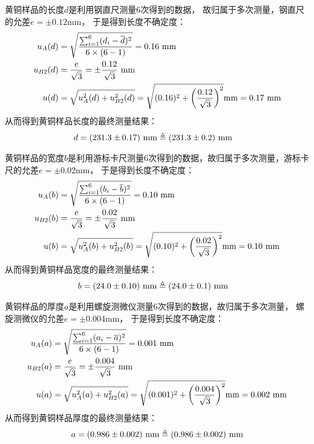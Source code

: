 \documentclass[11pt]{article}
\begin{document}
\newpage
黄铜样品的长度$d$是利用钢直尺测量6次得到的数据，
故归属于多次测量，钢直尺的允差$e=\pm 0.12$mm，
于是得到长度不确定度：
\begin{align*}
     u_A(d)&=\sqrt{\frac{\sum_{i=1}^6(d_i-\overline d)^2}{6\times(6-1)}}=0.16\,\,{\rm mm}\\
     u_{B2}(d)&=\frac{e}{\sqrt 3}=\pm \frac{0.12}{\sqrt 3} \,\,{\rm mm}\\
     u(d)&=
    \sqrt{u_{A}^2(d)+u^2_{B2}(d)} =\sqrt{(0.16)^2+\left(\frac{0.12}{\sqrt3 }\right)^2}{\rm mm}
    =0.17 \,\,{\rm mm}
\end{align*}
从而得到黄铜样品长度的最终测量结果：
\begin{align*}
      d&=(231.3\pm 0.17)\,\, {\rm mm} \triangleq (231.3\pm 0.2) \,\,{\rm mm}
\end{align*}
 

黄铜样品的宽度$b$是利用游标卡尺测量6次得到的数据，故归属于多次测量，游标卡尺的允差$e=\pm 0.02$mm，
于是得到长度不确定度：
\begin{align*}
     u_A(b)&=\sqrt{\frac{\sum_{i=1}^6(b_i-\overline b)^2}{6\times(6-1)}}=0.10\,\,{\rm mm}\\
     u_{B2}(b)&=\frac{e}{\sqrt 3}=\pm \frac{0.02}{\sqrt 3} \,\,{\rm mm}\\
    u(b) &=
    \sqrt{u_{A}^2(b)+u^2_{B2}(b)} =\sqrt{(0.10)^2+\left(\frac{0.02}{\sqrt3 }\right)^2}{\rm mm}
    =0.10 \,\,{\rm mm}
\end{align*}
从而得到黄铜样品宽度的最终测量结果：
\begin{align*}
      b&=(24.0\pm 0.10)\,\, {\rm mm} \triangleq (24.0\pm 0.1) \,\,{\rm mm}
\end{align*}

黄铜样品的厚度$a$是利用螺旋测微仪测量6次得到的数据，故归属于多次测量，
螺旋测微仪的允差$e=\pm 0.004$mm，
于是得到长度不确定度：
\begin{align*}
    u_A(a) &=\sqrt{\frac{\sum_{i=1}^6(a_i-\overline a)^2}{6\times(6-1)}}=0.001\,\,{\rm mm}\\
    u_{B2}(a) &=\frac{e}{\sqrt 3}=\pm \frac{0.004}{\sqrt 3} \,\,{\rm mm}\\
     u(a)&=
    \sqrt{u_{A}^2(a)+u^2_{B2}(a)} =\sqrt{(0.001)^2+\left(\frac{0.004}{\sqrt3 }\right)^2}{\rm mm}
    =0.002 \,\,{\rm mm}
\end{align*}
从而得到黄铜样品厚度的最终测量结果：
\begin{align*}
      a=(0.986\pm 0.002)\,\, {\rm mm} \triangleq (0.986\pm 0.002) \,\,{\rm mm}
\end{align*}
\end{document}
